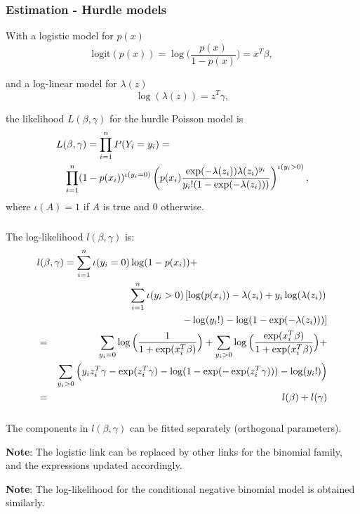 \documentclass{beamer}
\newcommand{\bs}{\bigskip}
\begin{document}
\begin{frame}
\frametitle{Estimation - Hurdle models}

With a logistic model for $p(x)$
$$\mbox{logit}(p(x)) = \log \Big(\frac{p(x)}{1-p(x)} \Big) = x^T
\beta,$$

and a log-linear model for $\lambda(z)$
$$\log(\lambda(z)) = z^T \gamma,$$

the likelihood $L(\beta,\gamma)$ for the hurdle Poisson model is
\begin{eqnarray*}
\lefteqn{L(\beta,\gamma) = \prod_{i=1}^n P(Y_i = y_i) = }\\
&&\prod_{i=1}^n (1-p(x_i))^{\iota(y_i=0)}  \left( p(x_i)\frac{\exp(-\lambda(z_i))
\lambda(z_i)^{y_i}}{y_i! (1-\exp(-\lambda(z_i)))} \right)^{\iota(y_i>0)},
\end{eqnarray*}
where $\iota(A)=1$ if $A$ is true and $0$ otherwise.
\end{frame}

\begin{frame}
\frametitle{}
The log-likelihood $l(\beta,\gamma)$ is:
\begin{eqnarray*}
\lefteqn{l(\beta,\gamma) =  \sum_{i=1}^n \iota(y_i=0) \log(1-p(x_i)) + }\\
& & \sum_{i=1}^n \iota(y_i>0) \left[ \log(p(x_i)) -\lambda(z_i) + y_i
\log(\lambda(z_i)) \right.\\
& &\left. - \log(y_i!) - \log(1-\exp(-\lambda(z_i))) \right]  \\
& = & \sum_{y_i=0} \log\Big( \frac{1}{1+\exp(x_i^T \beta)} \Big) + \sum_{y_i>0} \log\Big(\frac{\exp(x_i^T \beta)}{1+\exp(x_i^T \beta)} \Big)+\\
& & \sum_{y_i>0} \Big(y_i z_i^T \gamma - \exp(z_i^T \gamma) -  \log(1- \exp(-\exp(z_i^T \gamma))) - \log(y_i!)\Big)\\
& = & l(\beta)+l(\gamma)
\end{eqnarray*}

\end{frame}

\begin{frame}
\frametitle{}
The components in $l(\beta,\gamma)$ can be fitted separately (orthogonal parameters).

\bs
\bs
\textbf{Note}: The logistic link can be replaced by other links for the binomial
family, and the expressions updated accordingly. 

\bs
\textbf{Note}: The log-likelihood for the conditional negative binomial model
is obtained similarly. 

\end{frame}
\end{document}
